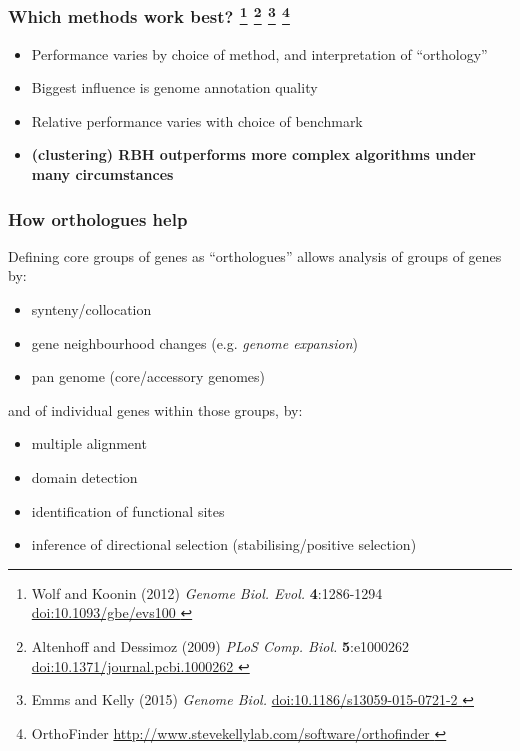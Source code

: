 % 
\begin{frame}
  \frametitle{Which methods work best?
    \footnote{\tiny{Wolf and Koonin (2012) \textit{Genome Biol. Evol.} \textbf{4}:1286-1294 \href{http://dx.doi.org/10.1093/gbe/evs100}{doi:10.1093/gbe/evs100
    }}}
    \footnote{\tiny{Altenhoff and Dessimoz (2009) \textit{PLoS Comp. Biol.} \textbf{5}:e1000262 \href{http://dx.doi.org/10.1371/journal.pcbi.1000262}{doi:10.1371/journal.pcbi.1000262
    }}}
    \footnote{\tiny{Emms and Kelly (2015) \textit{Genome Biol.} \href{http://dx.doi.org/10.1186/s13059-015-0721-2}{doi:10.1186/s13059-015-0721-2
    }}}
    \footnote{\tiny{OrthoFinder \href{http://www.stevekellylab.com/software/orthofinder}{http://www.stevekellylab.com/software/orthofinder
    }}}        
  }
  \begin{itemize}
    \item \textcolor{hutton_green}{Performance varies by choice of method, and interpretation of ``orthology''}
    \item \textcolor{hutton_blue}{Biggest influence is genome annotation quality}
    \item Relative performance varies with choice of benchmark
    \item \textcolor{hutton_purple}{\textbf{(clustering) RBH outperforms more complex algorithms under many circumstances}}
  \end{itemize}
\end{frame}

%
\begin{frame}
  \frametitle{How orthologues help}
  \textcolor{hutton_green}{Defining core groups of genes as ``orthologues'' allows analysis of groups of genes by:}
  \begin{itemize}
    \item \textcolor{hutton_purple}{synteny/collocation}
    \item gene neighbourhood changes (e.g. \textcolor{hutton_purple}{\textit{genome expansion}})
    \item \textcolor{hutton_purple}{pan genome (core/accessory genomes)}
  \end{itemize}
  \textcolor{hutton_blue}{and of individual genes within those groups, by:}
  \begin{itemize}
    \item multiple alignment
    \item domain detection
    \item identification of functional sites
    \item inference of directional selection (stabilising/positive selection)
  \end{itemize}  
\end{frame}

